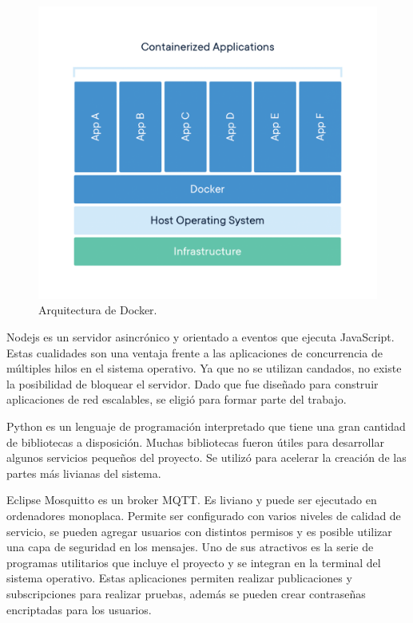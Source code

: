 \begin{figure}[h]
	\centering
	\includegraphics[width=\textwidth]{./Figures/ch2DockerContainer.png}
	\caption{Arquitectura de Docker. \citep{WEBSITE:WhatContainer}}
	\label{fig:ch2WhatContainer}
\end{figure}

Nodejs es un servidor asincrónico y orientado a eventos que ejecuta JavaScript.
Estas cualidades son una ventaja frente a las aplicaciones de concurrencia de múltiples hilos en el sistema operativo.
Ya que no se utilizan candados, no existe la posibilidad de bloquear el servidor.
Dado que fue diseñado para construir aplicaciones de red escalables, se eligió para formar parte del trabajo.

Python es un lenguaje de programación interpretado que tiene una gran cantidad de bibliotecas a disposición.
Muchas bibliotecas fueron útiles para desarrollar algunos servicios pequeños del proyecto.
Se utilizó para acelerar la creación de las partes más livianas del sistema.

Eclipse Mosquitto es un broker MQTT.
Es liviano y puede ser ejecutado en ordenadores monoplaca.
Permite ser configurado con varios niveles de calidad de servicio, se pueden agregar usuarios con distintos permisos y es posible utilizar una capa de seguridad en los mensajes.
Uno de sus atractivos es la serie de programas utilitarios que incluye el proyecto y se integran en la terminal del sistema operativo.
Estas aplicaciones permiten realizar publicaciones y subscripciones para realizar pruebas, además se pueden crear contraseñas encriptadas para los usuarios.

